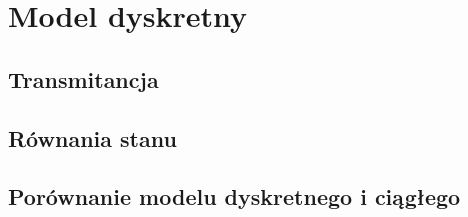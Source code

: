 \chapter{Model dyskretny}
\section{Transmitancja}
\section{Równania stanu}
\section{Porównanie modelu dyskretnego i ciągłego}